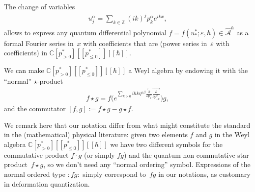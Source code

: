 \documentclass[pdftex]{sigma}
\numberwithin{equation}{section}
\newcommand{\mbZ}{\mathbb Z}
\newcommand{\mbC}{\mathbb C}
\newcommand{\<}{\left<}
\renewcommand{\>}{\right>}
\newcommand{\eps}{\varepsilon}
\newcommand{\hcA}{\widehat{\mathcal A}}
\begin{document}
The change of variables
\begin{gather*}
u^\alpha_j=\sum_{k\in\mbZ}(ik)^jp^\alpha_k e^{ikx},\end{gather*}
allows to express any quantum dif\/ferential polynomial $f=f(u^*_*;\eps,\hbar)\in \hcA^\hbar$ as a formal Fourier series in~$x$ with coef\/f\/icients that are (power series in~$\eps$ with coef\/f\/icients) in
$\mbC[p^*_{>0}][[p^*_{\leq 0}]][[\hbar]]$.

We can make $\mbC[p^*_{>0}][[p^*_{\leq 0}]][[\hbar]]$ a Weyl algebra by endowing it with the ``normal'' $\star$-product
\begin{gather*}
f \star g =f \bigg( e^{\sum\limits_{k>0} i \hbar k \eta^{\alpha \beta} \overleftarrow{\frac{\partial }{\partial p^\alpha_{k}}} \overrightarrow{\frac{\partial }{\partial p^\beta_{-k}}}}\bigg) g,
\end{gather*}
and the commutator $[f,g]:=f\star g - g \star f$.

\begin{Remark}
We remark here that our notation dif\/fer from what might constitute the standard in the (mathematical) physical literature: given two elements $f$ and $g$ in the Weyl algebra $\mbC[p^*_{>0}][[p^*_{\leq 0}]][[\hbar]]$ we have two dif\/ferent symbols for the commutative product $f\cdot g$ (or simply $fg$) and the quantum non-commutative star-product~$f \star g$, so we don't need any ``normal ordering'' symbol. Expressions of the normal ordered type ${:}fg{:}$ simply correspond to~$fg$ in our notations, as customary in deformation quantization.
\end{Remark}
\end{document}
